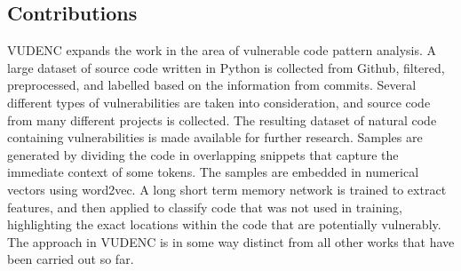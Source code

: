 \documentclass[
	a4paper,
	pagesize,
	pdftex,
	12pt,
	twoside, %
	BCOR=5mm, %
	ngerman,
	fleqn,
	final,
	]{scrartcl}
\begin{document}
\subsection{Contributions}

VUDENC expands the work in the area of vulnerable code pattern analysis. A large dataset of source code written in Python is collected from Github, filtered, preprocessed, and labelled based on the information from commits. Several different types of vulnerabilities are taken into consideration, and source code from many different projects is collected. The resulting dataset of natural code containing vulnerabilities is made available for further research. Samples are generated by dividing the code in overlapping snippets that capture the immediate context of some tokens. The samples are embedded in numerical vectors using word2vec. A long short term memory network is trained to extract features, and then applied to classify code that was not used in training, highlighting the exact locations within the code that are potentially vulnerably. The approach in VUDENC is in some way distinct from all other works that have been carried out so far.\\
\end{document}
